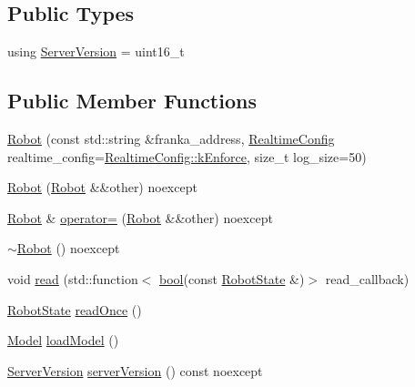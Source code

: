 \subsection*{Public Types}
\begin{DoxyCompactItemize}
\item 
using \hyperlink{classfranka_1_1Robot_ad1dd3dccff6f33691d2c66eaa5ac5a10}{Server\+Version} = uint16\+\_\+t
\end{DoxyCompactItemize}
\subsection*{Public Member Functions}
\begin{DoxyCompactItemize}
\item 
\hyperlink{classfranka_1_1Robot_ae63bc19390df3d54f3a270814df35eb6}{Robot} (const std\+::string \&franka\+\_\+address, \hyperlink{namespacefranka_aeede4f4629390fea21ca5e5a35a8a943}{Realtime\+Config} realtime\+\_\+config=\hyperlink{namespacefranka_aeede4f4629390fea21ca5e5a35a8a943a024bd586d70db805d622b85815bfa0de}{Realtime\+Config\+::k\+Enforce}, size\+\_\+t log\+\_\+size=50)
\item 
\hyperlink{classfranka_1_1Robot_a378d415475336082e81a35b9811dc6c2}{Robot} (\hyperlink{classfranka_1_1Robot}{Robot} \&\&other) noexcept
\item 
\hyperlink{classfranka_1_1Robot}{Robot} \& \hyperlink{classfranka_1_1Robot_a2ea3ee0a2e18796972fd8d93822e7998}{operator=} (\hyperlink{classfranka_1_1Robot}{Robot} \&\&other) noexcept
\item 
\hyperlink{classfranka_1_1Robot_a28abb25d25b5a1ce4463e32a518682e4}{$\sim$\+Robot} () noexcept
\item 
void \hyperlink{classfranka_1_1Robot_a82f85eed20426901a7e77b66c041664b}{read} (std\+::function$<$ \hyperlink{classbool}{bool}(const \hyperlink{structfranka_1_1RobotState}{Robot\+State} \&)$>$ read\+\_\+callback)
\item 
\hyperlink{structfranka_1_1RobotState}{Robot\+State} \hyperlink{classfranka_1_1Robot_a7ea7074a07b63fcf6933e97b078c7168}{read\+Once} ()
\item 
\hyperlink{classfranka_1_1Model}{Model} \hyperlink{classfranka_1_1Robot_a2da598c539469827409ac7e3bb61d5da}{load\+Model} ()
\item 
\hyperlink{classfranka_1_1Robot_ad1dd3dccff6f33691d2c66eaa5ac5a10}{Server\+Version} \hyperlink{classfranka_1_1Robot_a7cc1883114afecff80259615e40d9af8}{server\+Version} () const noexcept
\end{DoxyCompactItemize}
